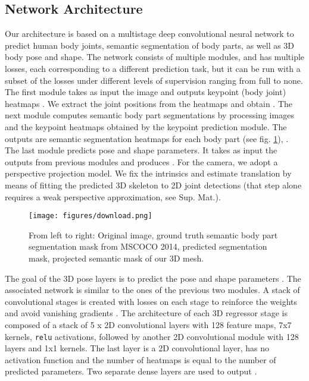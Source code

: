 \documentclass[runningheads]{llncs}
\begin{document}
\subsection{Network Architecture}

Our architecture is based on a multistage deep convolutional neural network to predict human body joints, semantic segmentation of body parts, as well as 3D body pose and shape. The network consists of multiple modules, and has multiple losses, each corresponding to a different prediction task, but it can be run with a subset of the losses under different levels of supervision ranging from full to none. The first module takes as input the image and outputs keypoint (body joint) heatmaps \cite{Cao2017paf2d}. We extract the joint positions from the heatmaps and obtain . The next module computes semantic body part segmentations by processing images and the keypoint heatmaps obtained by the keypoint prediction module. The outputs are semantic segmentation heatmaps for each body part (see fig. \ref{fig:segmentation}), . The last module predicts pose and shape parameters. It takes as input the outputs from previous modules and produces . For the camera, we adopt a perspective projection model. We fix the intrinsics and estimate translation by means of fitting the predicted 3D skeleton to 2D joint detections (that step alone requires a weak perspective approximation, see Sup. Mat.).

\begin{figure}[h!]
\begin{center}
    \texttt{[image: figures/download.png]}
\end{center}
\caption{\small From left to right: Original image, ground truth semantic body part segmentation mask from MSCOCO 2014, predicted segmentation mask, projected semantic mask of our 3D mesh.}
\label{fig:segmentation}
\end{figure}    

The goal of the 3D pose layers is to predict the pose and shape parameters . The associated network is similar to the ones of the previous two modules. A stack of convolutional stages is created with losses on each stage to reinforce the weights and avoid vanishing gradients  \cite{wei2016cpm,Cao2017paf2d}. The architecture of each 3D regressor stage is composed of a stack of 5 x 2D convolutional layers with 128 feature maps, 7x7 kernels, \verb|relu| activations, followed by another 2D convolutional module with 128 layers and  1x1 kernels. The last layer is a 2D convolutional layer, has no activation function and the number of heatmaps is equal to the number of predicted parameters. Two separate dense layers are used to output .
\end{document}
